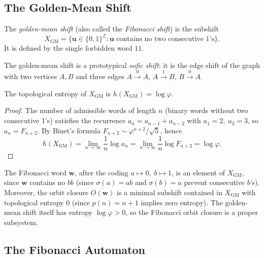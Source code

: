\subsection{The Golden-Mean Shift}
\label{subsec:ch19-golden-shift}

\begin{definition}%
  \label{def:golden-shift}
  The \emph{golden-mean shift} (also called the \emph{Fibonacci shift})
  is the subshift
  \[
    X_{\mathrm{GM}} = \bigl\{\mathbf{u}\in\{0,1\}^{\mathbb{Z}}
    : \mathbf{u}\text{ contains no two consecutive 1's}\bigr\}.
  \]
  It is defined by the single forbidden word \(11\).
\end{definition}

The golden-mean shift is a prototypical \emph{sofic shift}: it is
the edge shift of the graph with two vertices \(A,B\) and three
edges \(A\xrightarrow{0}A\), \(A\xrightarrow{1}B\),
\(B\xrightarrow{0}A\).

\begin{proposition}\label{prop:gm-entropy}
  The topological entropy of \(X_{\mathrm{GM}}\) is
  \(h(X_{\mathrm{GM}})=\log\varphi\).
\end{proposition}
\begin{proof}
  The number of admissible words of length \(n\) (binary words without
  two consecutive 1's) satisfies the recurrence \(a_n=a_{n-1}+a_{n-2}\)
  with \(a_1=2,\;a_2=3\), so \(a_n=F_{n+2}\).  By Binet's formula
  \(F_{n+2}\sim \varphi^{n+2}/\sqrt{5}\), hence
  \[
    h(X_{\mathrm{GM}}) = \lim_{n\to\infty}\frac{1}{n}\log a_n
    = \lim_{n\to\infty}\frac{1}{n}\log F_{n+2} = \log\varphi.
  \]
\end{proof}

The Fibonacci word \(\mathbf{w}\), after the coding
\(a\mapsto 0,\;b\mapsto 1\), is an element of \(X_{\mathrm{GM}}\),
since \(\mathbf{w}\) contains no \(bb\) (since \(\sigma(a)=ab\) and
\(\sigma(b)=a\) prevent consecutive \(b\)'s).  Moreover, the orbit
closure \(\overline{O(\mathbf{w})}\) is a minimal subshift contained
in \(X_{\mathrm{GM}}\) with topological entropy \(0\) (since
\(p(n)=n+1\) implies zero entropy).  The golden-mean shift itself has
entropy \(\log\varphi>0\), so the Fibonacci orbit closure is a proper
subsystem.

\subsection{The Fibonacci Automaton}
\label{subsec:ch19-automaton}


